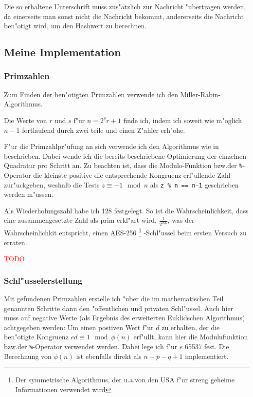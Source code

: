 \documentclass[12pt]{article}
\newcommand{\todo}[1]{\textcolor{red}{\mbox{TODO}}\marginpar{\textcolor{red}{#1}}}
\begin{document}
Die so erhaltene Unterschrift muss zus"atzlich zur Nachricht "ubertragen werden,
da einerseits man sonst nicht die Nachricht bekommt, andererseits die Nachricht
ben"otigt wird, um den Hashwert zu berechnen.

\subsection{Meine Implementation}
\subsubsection{Primzahlen}
Zum Finden der ben"otigten Primzahlen verwende ich den Miller-Rabin-Algorithmus.

Die Werte von $r$ und $s$ f"ur $n = 2^s r + 1$ finde ich, indem ich soweit wie m"oglich
$n - 1$ fortlaufend durch zwei teile und einen Z"ahler erh"ohe.

F"ur die Primzahlpr"ufung an sich verwende ich den Algorithmus wie in~\cite{hac} beschrieben.
Dabei wende ich die bereits beschriebene Optimierung der einzelnen Quadratur pro Schritt an.
Zu beachten ist, dass die Modulo-Funktion bzw.\@ der \verb|%|-Operator
die kleinste positive die entsprechende Kongruenz erf"ullende Zahl zur"uckgeben,
weshalb die Tests $z \equiv -1 \mod n$ als \verb|z % n == n-1| geschrieben werden m"ussen.

Als Wiederholungszahl habe ich 128 festgelegt.
So ist die Wahrscheinlichkeit, dass eine zusammengesetzte Zahl als prim erkl"art wird,
$\frac{1}{2^{256}}$, was der Wahrscheinlichkit entspricht, einen AES-256%
\footnote{Der symmetrische Algorithmus, der u.a.\@ von den USA f"ur streng geheime Informationen verwendet wird}%
-Schl"ussel beim ersten Versuch zu erraten.

\todo{Quellcode hier einf"ugen?}

\subsubsection{Schl"usselerstellung}
Mit gefundenen Primzahlen erstelle ich "uber die im mathematischen Teil genannten Schritte
dann den "offentlichen und privaten Schl"ussel.
Auch hier muss auf negative Werte (als Ergebnis des erweiterten Euklidschen Algorithmus)
achtgegeben werden: Um einen postiven Wert f"ur $d$ zu erhalten, der die ben"otigte Kongruenz
$ed \equiv 1 \mod \phi(n)$ erf"ullt, kann hier die Modulufunktion bzw.\@ der \verb|%|-Operator
verwendet werden.
Dabei lege ich f"ur $e$ 65537 fest.
Die Berechnung von $\phi(n)$ ist ebenfalls direkt als $n - p - q + 1$ implementiert.
\end{document}
